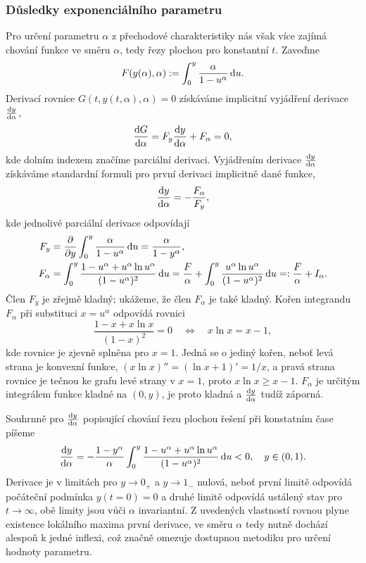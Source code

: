 \subsubsection{Důsledky exponenciálního parametru}\label{sss:dusledky_exponencialniho_parametru}
Pro určení parametru $\alpha$ z přechodové charakteristiky nás však více zajímá chování funkce ve směru $\alpha$, tedy řezy plochou pro konstantní $t$. Zaveďme 
\begin{equation}\label{eq:def_F_without_time_integral}
    F(y(\alpha),\alpha):=\int_0^y\frac{\alpha}{1-u^\alpha}\,\mathrm{d}{u}.
\end{equation}
Derivací rovnice $G(t,y(t,\alpha),\alpha)=0$ získáváme implicitní vyjádření derivace $\frac{\mathrm{d} y}{\mathrm{d} \alpha}$,
\begin{equation}
    \frac{\mathrm{d} G}{\mathrm{d} \alpha}=F_y \frac{\mathrm{d} y}{\mathrm{d} \alpha}+F_\alpha=0,
\end{equation}
kde dolním indexem značíme parciální derivaci. Vyjádřením derivace $\frac{\mathrm{d} y}{\mathrm{d} \alpha}$ získáváme standardní formuli pro první derivaci implicitně dané funkce,
\begin{equation}\label{eq:implicit_first_general}
    \frac{\mathrm{d} y}{\mathrm{d} \alpha}=-\frac{F_\alpha}{F_y},
\end{equation}
kde jednolivé parciální derivace odpovídají
\begin{align}
    F_y&=\frac{\partial }{\partial y}\int_0^y\frac{\alpha}{1-u^\alpha}\,\mathrm{d}{u}=\frac{\alpha}{1-y^\alpha},\\
    F_\alpha&=\int_0^y\frac{1-u^\alpha+u^\alpha \ln{u^\alpha}}{(1-u^\alpha)^2}\,\mathrm{d}{u}=\frac{F}{\alpha}+\int_0^y\frac{u^\alpha \ln{u^\alpha}}{(1-u^\alpha)^2}\,\mathrm{d}{u}=:\frac{F}{\alpha}+I_\alpha.
\end{align}
Člen $F_y$ je zřejmě kladný; ukážeme, že člen $F_\alpha$ je také kladný. Kořen integrandu $F_\alpha$ při substituci $x=u^\alpha$ odpovídá rovnici
\begin{equation}\label{eq:convex_tangent_positive_argument}
    \frac{1-x+x\ln{x}}{(1-x)^2}=0\quad \Longleftrightarrow \quad x\ln{x}=x-1,
\end{equation}
kde rovnice je zjevně splněna pro $x=1$. Jedná se o jediný kořen, neboť levá strana je konvexní funkce, $(x\ln{x})''=(\ln{x}+1)'=1/x$, a pravá strana rovnice je tečnou ke grafu levé strany v $x=1$, proto $x\ln{x}\geq x-1$. $F_\alpha$ je určitým integrálem funkce kladné na $(0,y)$, je proto kladná a $\frac{\mathrm{d} y}{\mathrm{d} \alpha}$ tudíž záporná. 

Souhrnně pro $\frac{\mathrm{d} y}{\mathrm{d} \alpha}$ popisující chování řezu plochou řešení při konstatním čase píšeme
\begin{equation}\label{eq:dy_da_is_negative}
    \frac{\mathrm{d} y}{\mathrm{d} \alpha}=-\frac{1-y^\alpha}{\alpha}\int_0^y\frac{1-u^\alpha+u^\alpha\ln{u^\alpha}}{(1-u^\alpha)^2}\,\mathrm{d}{u} <0,\quad y\in(0,1).
\end{equation}
Derivace je v limitách pro $y\to0_+$ a $y\to 1_-$ nulová, neboť první limitě odpovídá počáteční podmínka $y(t=0)=0$ a druhé limitě odpovídá ustálený stav pro $t\to \infty$, obě limity jsou vůči $\alpha$ invariantní. Z uvedených vlastností rovnou plyne existence lokálního maxima první derivace, ve směru $\alpha$ tedy nutně dochází alespoň k jedné inflexi, což značně omezuje dostupnou metodiku pro určení hodnoty parametru.

